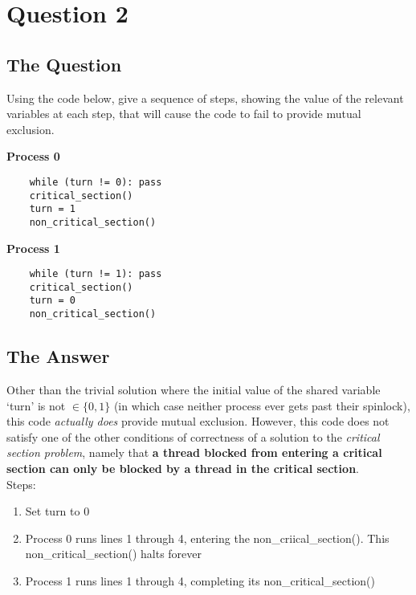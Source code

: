 \documentclass[11pt, letterpaper]{article}
\begin{document}
\pagebreak

\section*{Question 2}
\label{sec:question_2}

\subsection*{The Question}
\label{sub:the_question}

Using the code below, give a sequence of steps, showing the value of the relevant variables at each step, that will cause the code to fail to provide mutual exclusion. \\

\begin{minipage}{0.5\textwidth}
    \textbf{Process 0}
    \begin{verbatim}
    while (turn != 0): pass
    critical_section()
    turn = 1
    non_critical_section()
    \end{verbatim}
\end{minipage}
\begin{minipage}{0.5\textwidth}
    \textbf{Process 1}
    \begin{verbatim}
    while (turn != 1): pass
    critical_section()
    turn = 0
    non_critical_section()
    \end{verbatim}
\end{minipage}

\subsection*{The Answer}
\label{sub:the_answer}

Other than the trivial solution where the initial value of the shared variable `turn' is not $\in \{0,1\}$ (in which case neither process ever gets past their spinlock), this code \textit{actually does} provide mutual exclusion.  However, this code does not satisfy one of the other conditions of correctness of a solution to the \textit{critical section problem}, namely that \textbf{a thread blocked from entering a critical section can only be blocked by a thread in the critical section}. \\

Steps:

\begin{enumerate}
    \item Set turn to 0
    \item Process 0 runs lines 1 through 4, entering the non\_criical\_section().  This non\_critical\_section() halts forever
    \item Process 1 runs lines 1 through 4, completing its non\_critical\_section()
\end{enumerate}
\end{document}

